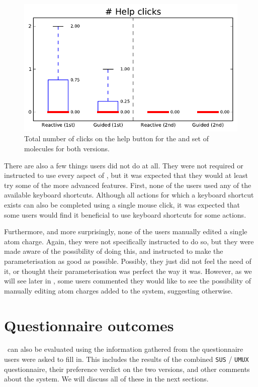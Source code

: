 \begin{figure}[h!]
\center
\includegraphics[width=.6\textwidth]{img/graphs/1b_01.pdf}
\caption{Total number of clicks on the help button for the  and  set of molecules for both versions.}
\end{figure}

There are also a few things users did not do at all. They were not required or instructed to use every aspect of \oframp, but it was expected that they would at least try some of the more advanced features. First, none of the users used any of the available keyboard shortcuts. Although all actions for which a keyboard shortcut exists can also be completed using a single mouse click, it was expected that some users would find it beneficial to use keyboard shortcuts for some actions.

Furthermore, and more surprisingly, none of the users manually edited a single atom charge. Again, they were not specifically instructed to do so, but they were made aware of the possibility of doing this, and instructed to make the parameterisation as good as possible. Possibly, they just did not feel the need of it, or thought their parameterisation was perfect the way it was. However, as we will see later in , some users commented they would like to see the possibility of manually editing atom charges added to the system, suggesting otherwise.



\section{Questionnaire outcomes}
\oframp\ can also be evaluated using the information gathered from the questionnaire users were asked to fill in. This includes the results of the combined \verb|SUS| / \verb|UMUX| questionnaire, their preference verdict on the two versions, and other comments about the system. We will discuss all of these in the next sections.


